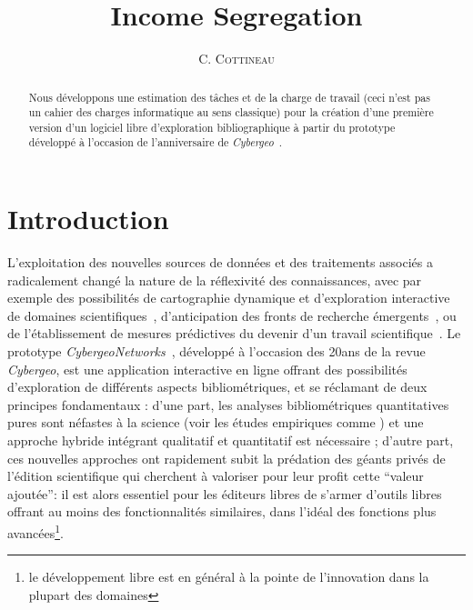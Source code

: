 \documentclass[11pt]{article}
\newcommand{\noun}[1]{\textsc{#1}}
\begin{document}
\title{Income Segregation\bigskip\\
}

\author{\noun{C. Cottineau}}


\maketitle

\justify


\begin{abstract}
Nous développons une estimation des tâches et de la charge de travail (ceci n'est pas un cahier des charges informatique au sens classique) pour la création d'une première version  d'un logiciel libre d'exploration bibliographique à partir du prototype développé à l'occasion de l'anniversaire de \emph{Cybergeo}~\cite{cybergeo20}.
\end{abstract}


\section{Introduction}

L'exploitation des nouvelles sources de données et des traitements associés a radicalement changé la nature de la réflexivité des connaissances, avec par exemple des possibilités de cartographie dynamique \cite{chavalarias2013phylomemetic} et d'exploration interactive de domaines scientifiques~\cite{chen2010citespace}, d'anticipation des fronts de recherche émergents~\cite{shibata2008detecting}, ou de l'établissement de mesures prédictives du devenir d'un travail scientifique~\cite{2013arXiv1310.8220N,2014arXiv1402.7268S}. Le prototype \emph{CybergeoNetworks}~\cite{cybergeo20}, développé à l'occasion des 20ans de la revue \emph{Cybergeo}, est une application interactive en ligne offrant des possibilités d'exploration de différents aspects bibliométriques, et se réclamant de deux principes fondamentaux : d'une part, les analyses bibliométriques quantitatives pures sont néfastes à la science (voir les études empiriques comme \cite{alberto2015they}) et une approche hybride intégrant qualitatif et quantitatif est nécessaire ; d'autre part, ces nouvelles approches ont rapidement subit la prédation des géants privés de l'édition scientifique qui cherchent à valoriser pour leur profit cette ``valeur ajoutée'': il est alors essentiel pour les éditeurs libres de s'armer d'outils libres offrant au moins des fonctionnalités similaires, dans l'idéal des fonctions plus avancées\footnote{le développement libre est en général à la pointe de l'innovation dans la plupart des domaines}.
\end{document}
